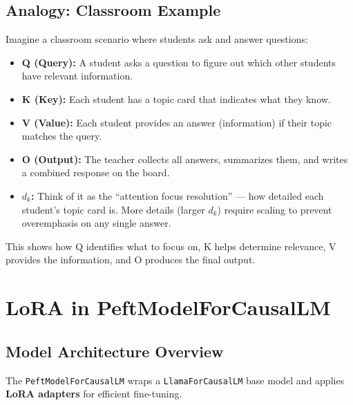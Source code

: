 \subsection{Analogy: Classroom Example}

\begin{tcolorbox}[colback=yellow!5!white,colframe=yellow!75!black,title=Analogy]
Imagine a classroom scenario where students ask and answer questions:

\begin{itemize}
    \item \textbf{Q (Query):} A student asks a question to figure out which other students have relevant information.
    \item \textbf{K (Key):} Each student has a topic card that indicates what they know.
    \item \textbf{V (Value):} Each student provides an answer (information) if their topic matches the query.
    \item \textbf{O (Output):} The teacher collects all answers, summarizes them, and writes a combined response on the board.
    \item \textbf{$d_k$:} Think of it as the “attention focus resolution” — how detailed each student’s topic card is. More details (larger $d_k$) require scaling to prevent overemphasis on any single answer.
\end{itemize}

This shows how Q identifies what to focus on, K helps determine relevance, V provides the information, and O produces the final output.
\end{tcolorbox}


\newpage
\section{LoRA in PeftModelForCausalLM}


\subsection{Model Architecture Overview}

The \texttt{PeftModelForCausalLM} wraps a \texttt{LlamaForCausalLM} base model and applies \textbf{LoRA adapters} for efficient fine-tuning.

